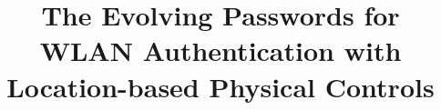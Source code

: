 \documentclass[conference]{IEEEtran}
\begin{document}
%
\title{The Evolving Passwords for WLAN Authentication with Location-based Physical Controls
}
%
%

%
\maketitle              %
%












%
%
%
 
 
\end{document}
